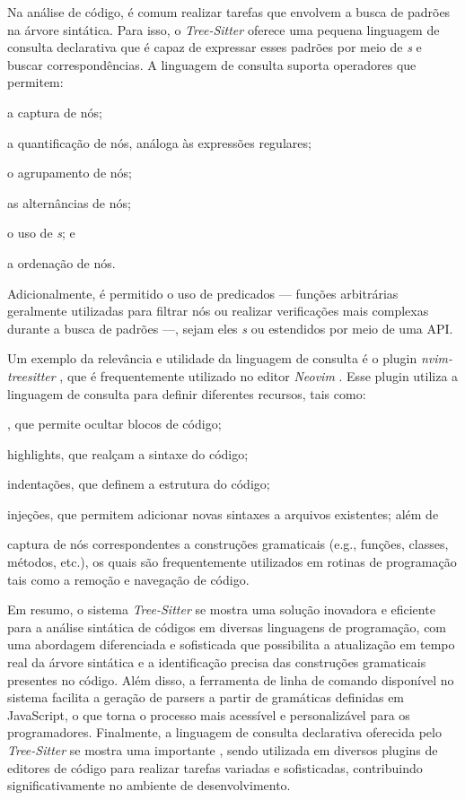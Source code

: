 \documentclass
  [11pt,a4paper,english,brazil,openright,sumario=tradicional,twoside]
  {abntex2}
\newcommand{\treesitter}{\textit{Tree-Sitter}\xspace}
\begin{document}
  Na análise de código, é comum realizar tarefas que envolvem a busca de
  padrões na árvore sintática. Para isso, o \treesitter oferece uma pequena
  linguagem de consulta declarativa que é capaz de expressar esses padrões por
  meio de \textit{s} e buscar correspondências. A linguagem
  de consulta suporta operadores que permitem:
  \begin{inparaenum}
    \item a captura de nós;
    \item a quantificação de nós, análoga às expressões regulares;
    \item o agrupamento de nós;
    \item as alternâncias de nós;
    \item o uso de \textit{s}; e
    \item a ordenação de nós.
  \end{inparaenum}
  Adicionalmente, é permitido o uso de predicados --- funções arbitrárias
  geralmente utilizadas para filtrar nós ou realizar verificações mais
  complexas durante a busca de padrões ---, sejam eles
  \textit{s} ou estendidos por meio de uma API.

  Um exemplo da relevância e utilidade da linguagem de consulta é o plugin
  \textit{nvim-treesitter} \cite{nvim-treesitter-2023-nvim}, que é
  frequentemente utilizado no editor \textit{Neovim}
  \cite{neovim-2023-hyperextensible}. Esse plugin utiliza a linguagem de
  consulta para definir diferentes recursos, tais como:
  \begin{inparaenum}
    \item \textit{}, que permite ocultar blocos de código;
    \item highlights, que realçam a sintaxe do código;
    \item indentações, que definem a estrutura do código;
    \item injeções, que permitem adicionar novas sintaxes a arquivos
          existentes; além de
    \item captura de nós correspondentes a construções gramaticais (e.g.,
          funções, classes, métodos, etc.), os quais são frequentemente
          utilizados em rotinas de programação tais como a remoção e navegação
          de código.
  \end{inparaenum}

  Em resumo, o sistema \treesitter se mostra uma solução inovadora e eficiente
  para a análise sintática de códigos em diversas linguagens de programação,
  com uma abordagem diferenciada e sofisticada que possibilita a atualização em
  tempo real da árvore sintática e a identificação precisa das construções
  gramaticais presentes no código. Além disso, a ferramenta de linha de comando
  disponível no sistema facilita a geração de parsers a partir de gramáticas
  definidas em JavaScript, o que torna o processo mais acessível e
  personalizável para os programadores. Finalmente, a linguagem de consulta
  declarativa oferecida pelo \treesitter se mostra uma importante
  \textit{}, sendo utilizada em diversos plugins de editores de
  código para realizar tarefas variadas e sofisticadas, contribuindo
  significativamente no ambiente de desenvolvimento.
\end{document}
